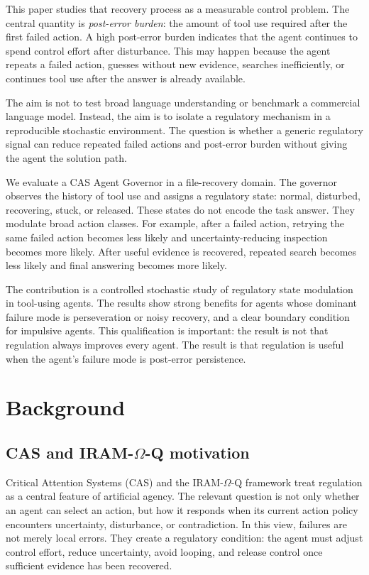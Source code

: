 \documentclass[11pt]{article}
\begin{document}
This paper studies that recovery process as a measurable control problem. The central quantity is \emph{post-error burden}: the amount of tool use required after the first failed action. A high post-error burden indicates that the agent continues to spend control effort after disturbance. This may happen because the agent repeats a failed action, guesses without new evidence, searches inefficiently, or continues tool use after the answer is already available.

The aim is not to test broad language understanding or benchmark a commercial language model. Instead, the aim is to isolate a regulatory mechanism in a reproducible stochastic environment. The question is whether a generic regulatory signal can reduce repeated failed actions and post-error burden without giving the agent the solution path.

We evaluate a CAS Agent Governor in a file-recovery domain. The governor observes the history of tool use and assigns a regulatory state: normal, disturbed, recovering, stuck, or released. These states do not encode the task answer. They modulate broad action classes. For example, after a failed action, retrying the same failed action becomes less likely and uncertainty-reducing inspection becomes more likely. After useful evidence is recovered, repeated search becomes less likely and final answering becomes more likely.

The contribution is a controlled stochastic study of regulatory state modulation in tool-using agents. The results show strong benefits for agents whose dominant failure mode is perseveration or noisy recovery, and a clear boundary condition for impulsive agents. This qualification is important: the result is not that regulation always improves every agent. The result is that regulation is useful when the agent's failure mode is post-error persistence.

\section{Background}

\subsection{CAS and IRAM-$\Omega$-Q motivation}

Critical Attention Systems (CAS) and the IRAM-$\Omega$-Q framework treat regulation as a central feature of artificial agency. The relevant question is not only whether an agent can select an action, but how it responds when its current action policy encounters uncertainty, disturbance, or contradiction. In this view, failures are not merely local errors. They create a regulatory condition: the agent must adjust control effort, reduce uncertainty, avoid looping, and release control once sufficient evidence has been recovered.
\end{document}
